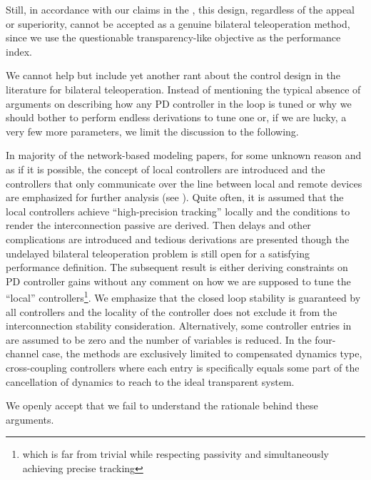 Still, in accordance with our claims in the , this design, regardless of the appeal or superiority, cannot be accepted as 
a genuine bilateral teleoperation method, since we use the questionable transparency-like objective as the performance index.

We cannot help but include yet another rant about the control design in the literature for bilateral teleoperation. Instead of mentioning the typical 
absence of arguments on describing how any PD controller in the loop is tuned or why we should bother to perform endless derivations to tune one 
or, if we are lucky, a very few more parameters, we limit the discussion to the following. 

In majority of the network-based modeling papers, for some unknown reason and as if it is possible, the concept of local controllers are introduced 
and the controllers that only communicate over the line between local and remote devices are emphasized for further analysis (see ). 
Quite often, it is assumed that the local controllers achieve \enquote{high-precision tracking} locally and the conditions to render 
the interconnection passive are derived. Then delays and other complications are introduced and tedious derivations are presented though 
the undelayed bilateral teleoperation problem is still open for a satisfying performance definition. The subsequent result is either 
deriving constraints on PD controller gains without any comment on how we are supposed to tune the \enquote{local} controllers\footnote{%
which is far from trivial while respecting passivity and simultaneously achieving precise tracking}. We emphasize that the closed loop 
stability is guaranteed by all controllers and the locality of the controller does not exclude it from the interconnection stability 
consideration. Alternatively, some controller entries in  are assumed to be zero and the number of variables is reduced. 
In the four-channel case, the methods are exclusively limited to compensated dynamics type, cross-coupling controllers where each entry is 
specifically equals some part of the cancellation of dynamics to reach to the ideal transparent system. 

We openly accept that we fail to understand the rationale behind these arguments.

